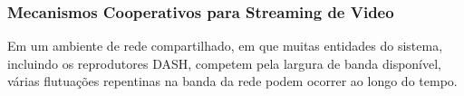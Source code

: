 


\subsubsection{Mecanismos Cooperativos para Streaming de Video}
\label{subsec:video-streaming}

Em um ambiente de rede compartilhado, em que muitas entidades do sistema, incluindo os reprodutores DASH, competem pela largura de banda disponível, várias flutuações repentinas na banda da rede podem ocorrer ao longo do tempo.

